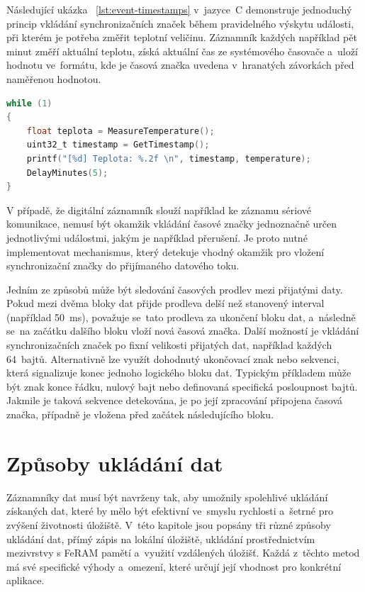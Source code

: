 Následující ukázka ~\ref{lst:event-timestamps} v~jazyce~C demonstruje jednoduchý princip vkládání synchronizačních značek během pravidelného výskytu události, při kterém je potřeba změřit teplotní veličinu. Záznamník každých například pět minut změří aktuální teplotu, získá aktuální čas ze systémového časovače a~uloží hodnotu ve~formátu, kde je časová značka uvedena v~hranatých závorkách před naměřenou hodnotou.

\begin{lstlisting}[language=C, caption={Vkládání časové značky zaznamenané události}, label={lst:event-timestamps}]
while (1)
{
    float teplota = MeasureTemperature();
    uint32_t timestamp = GetTimestamp();
    printf("[%d] Teplota: %.2f \n", timestamp, temperature);
    DelayMinutes(5);
}
\end{lstlisting}

V případě, že digitální záznamník slouží například ke záznamu sériové komunikace, nemusí být okamžik vkládání časové značky jednoznačně určen jednotlivými událostmi, jakým je například přerušení. Je proto nutné implementovat mechanismus, který detekuje vhodný okamžik pro vložení synchronizační značky do přijímaného datového toku.~\cite{perny2008zarizeni_cas_znacky}

Jedním ze způsobů může být sledování časových prodlev mezi přijatými daty. Pokud mezi dvěma bloky dat přijde prodleva delší než stanovený interval (například 50~ms), považuje se~tato prodleva za ukončení bloku dat, a~následně se~na začátku dalšího bloku vloží nová časová značka. Další možností je vkládání synchronizačních značek po fixní velikosti přijatých dat, například každých 64~bajtů. Alternativně lze využít dohodnutý ukončovací znak nebo sekvenci, která signalizuje konec jednoho logického bloku dat. Typickým příkladem může být znak konce řádku, nulový bajt nebo definovaná specifická posloupnost bajtů. Jakmile je taková sekvence detekována, je po její zpracování připojena časová značka, případně je vložena před začátek následujícího bloku.~\cite{perny2008zarizeni_cas_znacky}

\newpage

\section{Způsoby ukládání dat}
Záznamníky dat musí být navrženy tak, aby umožnily spolehlivé ukládání získaných dat, které by mělo být efektivní ve~smyslu rychlosti a~šetrné pro zvýšení životnosti úložiště. V~této kapitole jsou popsány tři různé způsoby ukládání dat, přímý zápis na lokální úložiště, ukládání prostřednictvím mezivrstvy s FeRAM pamětí a~využití vzdálených úložišť. Každá z~těchto metod má své specifické výhody a~omezení, které určují její vhodnost pro konkrétní aplikace.

